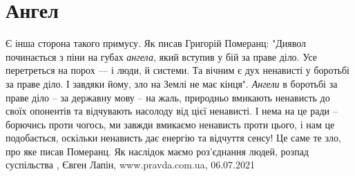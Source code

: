  
 
 
 
 
\chapter{Ангел}
\label{sec:slova.angel}

Є інша сторона такого примусу. Як писав Григорій Померанц: "Диявол починається
з піни на губах \emph{ангела}, який вступив у бій за праве діло. Усе
перетреться на порох — і люди, й системи. Та вічним є дух ненависті у боротьбі
за праве діло. І завдяки йому, зло на Землі не має кінця".  \emph{Ангели} в
боротьбі за праве діло – за державну мову – на жаль, природньо вмикають
ненависть до своїх опонентів та відчувають насолоду від цієї ненависті.  І нема
на це ради – борючись проти чогось, ми завжди вмикаємо ненависть проти цього, і
нам це подобається, оскільки ненависть дає енергію та відчуття сенсу!  Це саме
те зло, про яке писав Померанц.  Як наслідок маємо роз’єднання людей, розпад
суспільства
, 
Євген Лапін, www.pravda.com.ua, 06.07.2021

